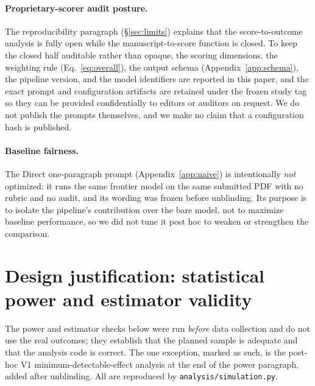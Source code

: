 \paragraph{Proprietary-scorer audit posture.} The reproducibility paragraph
(\S\ref{sec:limits}) explains that the score-to-outcome analysis is fully open
while the manuscript-to-score function is closed. To keep the closed half
auditable rather than opaque, the scoring dimensions, the weighting rule
(Eq.~\ref{eq:overall}), the output schema (Appendix~\ref{app:schema}), the
pipeline version, and the model identifiers are reported in this paper, and the
exact prompt and configuration artifacts are retained under the frozen study tag
so they can be provided confidentially to editors or auditors on request. We do
not publish the prompts themselves, and we make no claim that a configuration
hash is published.

\paragraph{Baseline fairness.} The Direct one-paragraph prompt
(Appendix~\ref{app:naive}) is intentionally \emph{not} optimized: it runs the
same frontier model on the same submitted PDF with no rubric and no audit, and
its wording was frozen before unblinding. Its purpose is to isolate the
pipeline's contribution over the bare model, not to maximize baseline
performance, so we did not tune it post hoc to weaken or strengthen the
comparison.

\section{Design justification: statistical power and estimator validity}
\label{app:power}
The power and estimator checks below were run \emph{before} data collection and
do not use the real outcomes; they establish that the planned sample is adequate
and that the analysis code is correct. The one exception, marked as such, is the
post-hoc V1 minimum-detectable-effect analysis at the end of the power
paragraph, added after unblinding. All are reproduced by
\texttt{analysis/simulation.py}.

